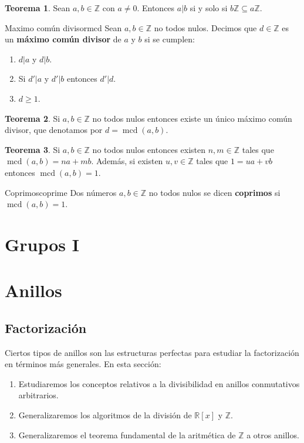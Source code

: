 \documentclass[a4paper]{book}
\theoremstyle{definition}
\newtheorem{theorem}{Teorema}[section]
\theoremstyle{ejemplo}
\theoremstyle{demostracion}
\newcommand{\reales}{\mathbb{R}}
\newcommand{\enteros}{\mathbb{Z}}
\DeclareMathOperator{\mcd}{mcd}
\begin{document}
\begin{theorem}
	Sean $a,b \in \enteros$ con $a \neq 0$. Entonces $a|b$ si y solo si $b\enteros \subseteq a\enteros$.
\end{theorem}

\begin{define}{Maximo común divisor}{mcd}
	Sean $a,b \in \enteros$ no todos nulos. Decimos que $d \in \enteros$ es un \textbf{máximo común divisor} de $a$ y $b$ si se cumplen:
	\begin{enumerate}
		\item
		$d|a$ y  $d|b$.
		
		\item
		Si $d'|a$ y $d'|b$ entonces $d'|d$.
		
		\item
		$d \geq 1$.
	\end{enumerate}	 
\end{define}

\begin{theorem}
	Si $a,b \in \enteros$ no todos nulos entonces existe un único máximo común divisor, que denotamos por $d = \mcd(a,b)$.
\end{theorem}

\begin{theorem}
	Si $a,b \in \enteros$ no todos nulos entonces existen $n, m \in \enteros$ tales que $\mcd(a,b) = na + mb$. Además, si existen $u,v \in \enteros$ tales que $1 = ua + vb$ entonces $\mcd(a,b) = 1$.
\end{theorem}

\begin{define}{Coprimos}{coprime}
	Dos números $a,b \in \enteros$ no todos nulos se dicen \textbf{coprimos} si $\mcd(a,b) = 1$.
\end{define}

\chapter{Grupos I}

\chapter{Anillos}

\section{Factorización}
Ciertos tipos de anillos son las estructuras perfectas para estudiar la factorización en términos más generales. En esta sección:
\begin{enumerate}
	\item
	Estudiaremos los conceptos relativos a la divisibilidad en anillos conmutativos arbitrarios.
	\item
	Generalizaremos los algoritmos de la división de $\reales[x]$ y $\enteros$.
	\item
	Generalizaremos el teorema fundamental de la aritmética de $\enteros$ a otros anillos.
\end{enumerate}
\end{document}
